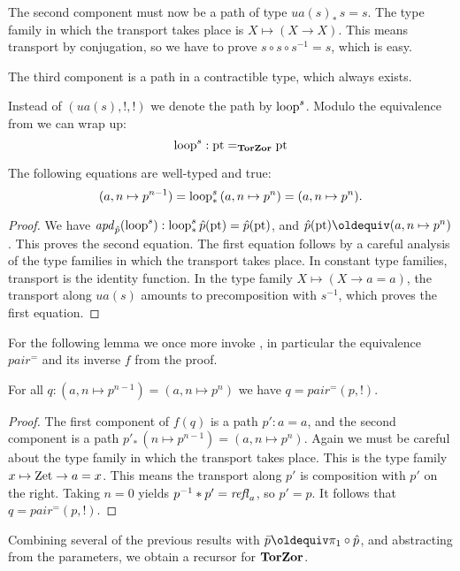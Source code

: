 \documentclass[a4,12pt]{amsart}
\begin{document}
The second component must now be
a path of type $ua(s)_*\, s = s$. The type family in which the transport
takes place is $X\mapsto (X\to X)$. This means transport by conjugation,
so we have to prove $s\circ s \circ s^{-1} = s$, which is easy.

The third component is a path in a contractible type, which always exists.

Instead of $(ua(s),!,!)$ we denote the path by $\mathrm{loop}^s$.
Modulo the equivalence from \cite[Theorem 2.7.2]{hottbook} we can wrap up:
\[
\mathrm{loop}^s : {\mathord{\mathrm{pt}}} =_{\mathbf{TorZor}} {\mathord{\mathrm{pt}}}
\]

\begin{lemma}\label{lem:TBN}
The following equations are well-typed and true:
\[
(a,n\mapsto p^{n-1}) = \mathrm{loop}^s_*\, (a,n\mapsto p^n) = (a,n\mapsto p^n).
\]
\end{lemma}
\begin{proof}
We have $\mathop{{\it apd}_{\hat{p}}}(\mathrm{loop}^s) : \mathrm{loop}^s_*\,\hat{p}({\mathord{\mathrm{pt}}}) = \hat{p}({\mathord{\mathrm{pt}}})$,
and $\hat{p}(\pt) \jdeq (a,n\mapsto p^n)$. This proves the second equation.
The first equation follows by a careful analysis of the type families
in which the transport takes place. In constant type families, transport
is the identity function. In the type family $X\mapsto (X\to a=a)$,
the transport along $ua(s)$ amounts to precomposition with $s^{-1}$,
which proves the first equation.
\end{proof}

For the following lemma we once more 
invoke \cite[Theorem 2.7.2]{hottbook}, in particular
the equivalence $pair^=$ and its inverse $f$ from the proof.

\begin{lemma}\label{lem:TBN}
For all $q:(a,n\mapsto p^{n-1}) = (a,n\mapsto p^n)$ we have $q=pair^=(p,!)$.
\end{lemma}
\begin{proof}
The first component of $f(q)$ is a path $p':a=a$,
and the second component is a path 
$p'_*\, (n\mapsto p^{n-1}) = (a,n\mapsto p^n)$.
Again we must be careful about the type family in which the
transport takes place. This is the type
family $x\mapsto \mathrm{Zet}\to a=x$. 
This means the transport along $p'$ is composition with $p'$ on the right.
Taking $n=0$ yields $p^{-1}* p' = \mathop{{\it refl}_{a}}$, so $p'=p$.
It follows that $q=pair^=(p,!)$.
\end{proof}

Combining several of the previous results with 
$\bar{p}\jdeq \pi_1 \circ \hat{p}$, and abstracting from the
parameters, we obtain a recursor for $\mathbf{TorZor}$.
\end{document}
